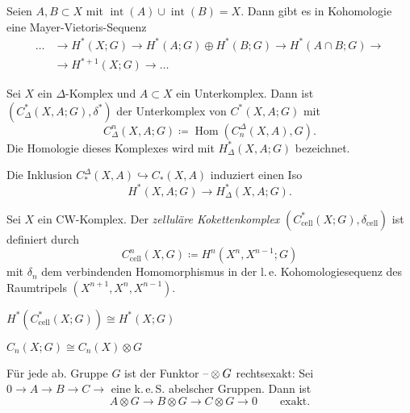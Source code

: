 \documentclass{cheat-sheet}
\DeclareMathOperator{\inte}{int} %
\DeclareMathOperator{\Hom}{Hom} %
\newcommand{\cell}{\text{cell}} %
\newcommand{\keS}{k.\,e.\,S.} %
\begin{document}
\begin{satz}
  Seien $A, B \subset X$ mit $\inte(A) \cup \inte(B) = X$. Dann gibt es in Kohomologie eine Mayer-Vietoris-Sequenz
  \begin{align*}
    \ldots & \to H^*(X; G) \to H^*(A; G) \oplus H^*(B; G) \to H^*(A \cap B; G) \to \\
    & \to H^{*+1}(X; G) \to \ldots
  \end{align*}
\end{satz}

\begin{defn}
  Sei $X$ ein $\Delta$-Komplex und $A \subset X$ ein Unterkomplex. Dann ist $(C^*_\Delta(X, A; G), \delta^*)$ der Unterkomplex von $C^*(X, A; G)$ mit
  \[ C^n_\Delta(X, A; G) \coloneqq \Hom(C^\Delta_n(X, A), G). \]
  Die Homologie dieses Komplexes wird mit $H^*_\Delta(X, A; G)$ bezeichnet.
\end{defn}

\begin{prop}
  Die Inklusion $C_*^\Delta(X, A) \hookrightarrow C_*(X, A)$ induziert einen Iso
  \[ H^*(X, A; G) \to H^*_\Delta(X, A; G). \]
\end{prop}


\begin{defn}
  Sei $X$ ein CW-Komplex. Der \emph{zelluläre Kokettenkomplex} $(C^*_\cell(X; G), \delta_\cell)$ ist definiert durch
  \[ C^n_\cell(X, G) \coloneqq H^n(X^n, X^{n-1}; G) \]
  mit $\delta_n$ dem verbindenden Homomorphismus in der l.\,e. Kohomologiesequenz des Raumtripels $(X^{n+1}, X^n, X^{n-1})$.
\end{defn}

\begin{prop}
  $H^*(C^*_\cell(X; G)) \cong H^*(X; G)$
\end{prop}




\begin{bem}
  $C_n(X; G) \cong C_n(X) \otimes G$
\end{bem}


\begin{prop}
  Für jede ab. Gruppe $G$ ist der Funktor $\text{--} \otimes G$ rechtsexakt:
  Sei $0 \to A \to B \to C \to$ eine \keS{} abelscher Gruppen. Dann ist
  \[
    A \otimes G \to B \otimes G \to C \otimes G \to 0
    \qquad \text{exakt.}
  \]
\end{prop}
\end{document}
